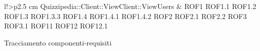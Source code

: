 \begin{tabella}{l!{\VRule}>{\centering\arraybackslash}p{2.5 cm}}
Quizzipedia::Client::ViewClient::ViewUsers & ROF1 \linebreak ROF1.1 \linebreak ROF1.2 \linebreak ROF1.3 \linebreak ROF1.3.3 \linebreak ROF1.4 \linebreak ROF1.4.1 \linebreak ROF1.4.2 \linebreak ROF2 \linebreak ROF2.1 \linebreak ROF2.2 \linebreak ROF3 \linebreak ROF3.1 \linebreak ROF11 \linebreak ROF12 \linebreak ROF12.1 \\
\caption{Tracciamento componenti-requisiti}
\end{tabella}
